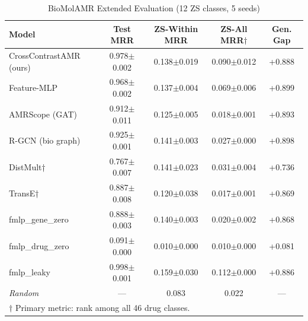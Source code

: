 \begin{table}[t]\centering
\caption{BioMolAMR Extended Evaluation (12 ZS classes, 5 seeds)}
\label{tab:biomolamr}
\begin{tabular}{lcccc}
\toprule
\textbf{Model} & \textbf{Test MRR} & \textbf{ZS-Within MRR} & \textbf{ZS-All MRR$\dagger$} & \textbf{Gen. Gap} \\
\midrule
CrossContrastAMR (ours) & 0.978$\pm$0.002 & 0.138$\pm$0.019 & 0.090$\pm$0.012 & +0.888 \\
Feature-MLP & 0.968$\pm$0.002 & 0.137$\pm$0.004 & 0.069$\pm$0.006 & +0.899 \\
AMRScope (GAT) & 0.912$\pm$0.011 & 0.125$\pm$0.005 & 0.018$\pm$0.001 & +0.893 \\
R-GCN (bio graph) & 0.925$\pm$0.001 & 0.141$\pm$0.003 & 0.027$\pm$0.000 & +0.898 \\
DistMult† & 0.767$\pm$0.007 & 0.141$\pm$0.023 & 0.031$\pm$0.004 & +0.736 \\
TransE† & 0.887$\pm$0.008 & 0.120$\pm$0.038 & 0.017$\pm$0.001 & +0.869 \\
fmlp_gene_zero & 0.888$\pm$0.003 & 0.140$\pm$0.003 & 0.020$\pm$0.002 & +0.868 \\
fmlp_drug_zero & 0.091$\pm$0.000 & 0.010$\pm$0.000 & 0.010$\pm$0.000 & +0.081 \\
fmlp_leaky & 0.998$\pm$0.001 & 0.159$\pm$0.030 & 0.112$\pm$0.000 & +0.886 \\
\textit{Random} & — & 0.083 & 0.022 & — \\
\bottomrule
\multicolumn{5}{l}{\small $\dagger$ Primary metric: rank among all 46 drug classes.}
\end{tabular}\end{table}